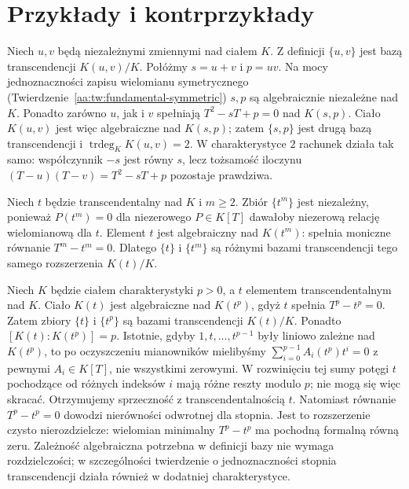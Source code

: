 \section{Przykłady i kontrprzykłady}
\begin{przyklad}
\label{aa:prz:transcendence-rational}
Niech $u,v$ będą niezależnymi zmiennymi nad ciałem $K$.
Z definicji $\{u,v\}$ jest bazą transcendencji $K(u,v)/K$.
Połóżmy $s=u+v$ i $p=uv$.
Na mocy jednoznaczności zapisu wielomianu symetrycznego
(Twierdzenie~\ref{aa:tw:fundamental-symmetric}) $s,p$
są algebraicznie niezależne nad $K$.
Ponadto zarówno $u$, jak i $v$ spełniają
$T^2-sT+p=0$ nad $K(s,p)$.
Ciało $K(u,v)$ jest więc algebraiczne nad $K(s,p)$;
zatem $\{s,p\}$ jest drugą bazą transcendencji i
$\operatorname{trdeg}_K K(u,v)=2$.
W charakterystyce $2$ rachunek działa tak samo: współczynnik
$-s$ jest równy $s$, lecz tożsamość iloczynu
$(T-u)(T-v)=T^2-sT+p$ pozostaje prawdziwa.
\end{przyklad}

\begin{przyklad}
Niech $t$ będzie transcendentalny nad $K$ i $m\ge2$.
Zbiór $\{t^m\}$ jest niezależny, ponieważ
$P(t^m)=0$ dla niezerowego $P\in K[T]$ dawałoby
niezerową relację wielomianową dla $t$.
Element $t$ jest algebraiczny nad $K(t^m)$:
spełnia moniczne równanie $T^m-t^m=0$.
Dlatego $\{t\}$ i $\{t^m\}$ są różnymi bazami
transcendencji tego samego rozszerzenia $K(t)/K$.
\end{przyklad}


\begin{przyklad}
\label{aa:prz:transcendence-inseparable}
Niech $K$ będzie ciałem charakterystyki $p>0$,
a $t$ elementem transcendentalnym nad $K$.
Ciało $K(t)$ jest algebraiczne nad $K(t^p)$, gdyż
$t$ spełnia $T^p-t^p=0$. Zatem zbiory $\{t\}$
i $\{t^p\}$ są bazami transcendencji $K(t)/K$.
Ponadto $[K(t):K(t^p)]=p$. Istotnie, gdyby
$1,t,\ldots,t^{p-1}$ były liniowo zależne nad $K(t^p)$,
to po oczyszczeniu mianowników mielibyśmy
$\sum_{i=0}^{p-1}A_i(t^p)t^i=0$ z pewnymi
$A_i\in K[T]$, nie wszystkimi zerowymi.
W rozwinięciu tej sumy potęgi $t$ pochodzące
od różnych indeksów $i$ mają różne reszty modulo $p$;
nie mogą się więc skracać. Otrzymujemy sprzeczność
z transcendentalnością $t$. Natomiast równanie
$T^p-t^p=0$ dowodzi nierówności odwrotnej dla stopnia.
Jest to rozszerzenie czysto nierozdzielcze: wielomian
minimalny $T^p-t^p$ ma pochodną formalną równą zeru.
Zależność algebraiczna potrzebna
w definicji bazy nie wymaga rozdzielczości;
w szczególności twierdzenie o jednoznaczności stopnia
transcendencji działa również w dodatniej charakterystyce.
\end{przyklad}

